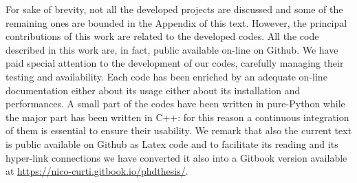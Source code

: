 \documentclass{standalone}
\begin{document}
For sake of brevity, not all the developed projects are discussed and some of the remaining ones are bounded in the Appendix of this text.
However, the principal contributions of this work are related to the developed codes.
All the code described in this work are, in fact, public available on-line on Github.
We have paid special attention to the development of our codes, carefully managing their testing and availability.
Each code has been enriched by an adequate on-line documentation either about its usage either about its installation and performances.
A small part of the codes have been written in pure-\textsf{Python} while the major part has been written in \textsf{C++}: for this reason a continuous integration of them is essential to ensure their usability.
We remark that also the current text is public available on Github as \textsf{Latex} code and to facilitate its reading and its hyper-link connections we have converted it also into a \textsf{Gitbook} version available at \url{https://nico-curti.gitbook.io/phdthesis/}.




\end{document}
